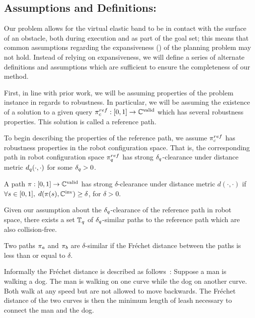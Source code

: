 \subsection{Assumptions and Definitions:}
\label{sec:rpath_assumptions}
Our problem allows for the virtual elastic band to be in contact with the surface of an obstacle, both during execution and as part of the goal set; this means that common assumptions regarding the expansiveness (\cite{Hsu1999}) of the planning problem may not hold. Instead of relying on expansiveness, we will define a series of alternate definitions and assumptions which are sufficient to ensure the completeness of our method.


First, in line with prior work, we will be assuming properties of the problem instance in regards to robustness.  In particular, we will be assuming the existence of a solution to a given query $\pi_{c}^{ref} : [0, 1] \rightarrow \mathbb{C}^\textrm{valid}$ which has several robustness properties.  This solution is called a reference path.


To begin describing the properties of the reference path, we assume $\pi_{c}^{ref}$ has robustness properties in the robot configuration space.  That is, the corresponding path in robot configuration space $\pi_{q}^{ref}$ has strong $\delta_q$-clearance under distance metric $d_q(\cdot,\cdot)$ for some $\delta_q > 0$.

\begin{definition}
    A path $\pi : [0, 1] \rightarrow \mathbb{C}^\textrm{valid}$ has strong $\delta$-clearance under distance metric $d(\cdot,\cdot)$ if $\forall s \in [0, 1],\; d(\pi(s), \mathbb{C}^\textrm{inv}) \geq \delta$, for $\delta > 0$.
\end{definition}

Given our assumption about the $\delta_q$-clearance of the reference path in robot space, there exists a set $\mathbb{T}_q$ of $\delta_q$-similar paths to the reference path which are also collision-free.


\begin{definition}
    Two paths $\pi_a$ and $\pi_b$ are $\delta$-similar if the Fr\'echet distance between the paths is less than or equal to $\delta$.
\end{definition}

Informally the Fr\'echet distance is described as follows~\cite{Alt1995Frechet}: Suppose a man is walking a dog. The man is walking on one curve while the dog on another curve. Both walk at any speed but are not allowed to move backwards. The Fr\'echet distance of the two curves is then the minimum length of leash necessary to connect the man and the dog.


